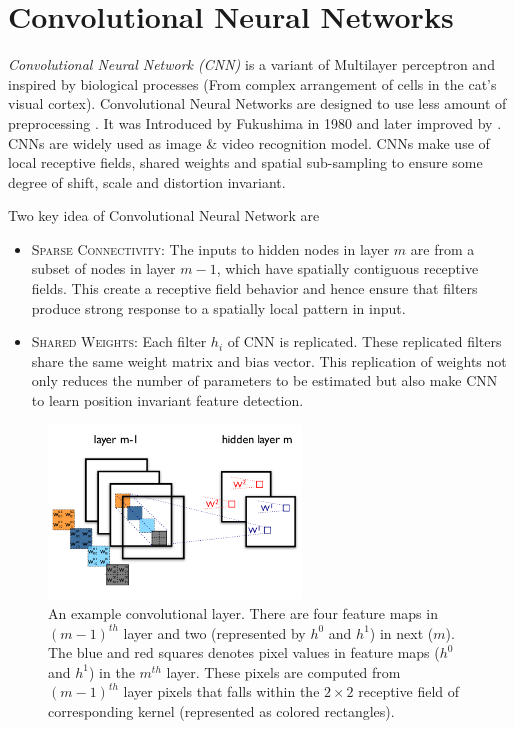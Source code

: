 \section{Convolutional Neural Networks}
\emph{Convolutional Neural Network (CNN)} is a variant of Multilayer perceptron and inspired by biological processes (From complex arrangement of cells in the cat's visual cortex). Convolutional Neural Networks are designed to use less amount of preprocessing \cite{lecun1998gradient}. It was Introduced by Fukushima in 1980 and later improved by \citet{lecun1998gradient}. CNNs are widely used as image \& video recognition model. CNNs make use of local receptive fields, shared weights and spatial sub-sampling to ensure some degree of shift, scale and distortion invariant.

\noindent Two key idea of Convolutional Neural Network are
\begin{itemize}
\item \textsc{Sparse Connectivity:} The inputs to hidden nodes in layer $m$ are from a subset of nodes in layer $m-1$, which have spatially contiguous receptive fields. This create a receptive field behavior and hence ensure that filters produce strong response to a spatially local pattern in input.


\item \textsc{Shared Weights:} Each filter $h_i$ of CNN is replicated. These replicated filters share the same weight matrix and bias vector. This replication of weights not only reduces the number of parameters to be estimated but also make CNN to learn position invariant feature detection.
\end{itemize}

\begin{figure}[!ht]
\centering
\includegraphics[width=0.6\textwidth]{./imgs/convolution.png} 
\caption[convolutional layer explained]{An example convolutional layer.  There are four feature maps in ${(m-1)}^{th}$ layer and two (represented by $h^0$ and $h^1$) in next ($m$). The blue and red squares denotes pixel values in feature maps ($h^0$ and $h^1$) in the $m^{th}$ layer. These pixels are computed from $(m-1)^{th}$ layer pixels that falls within the $2\times2$ receptive field of corresponding kernel (represented as colored rectangles).}
\label{fig:cnn_layer}
\end{figure}


